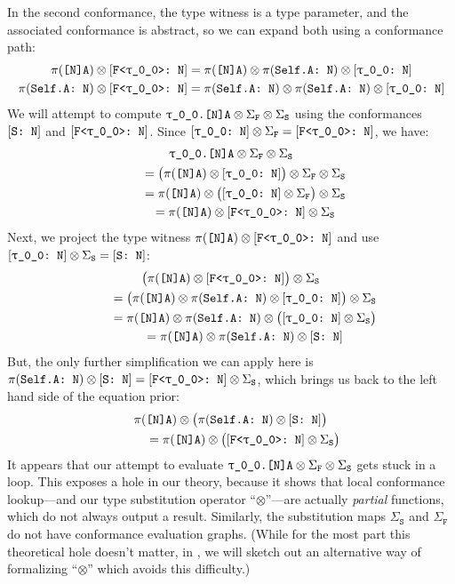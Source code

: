 \documentclass[../generics]{subfiles}
\begin{document}
In the second conformance, the type witness is a type parameter, and the associated conformance is abstract, so we can expand both using a conformance path:
\begin{gather*}
\AssocType{[N]A} \otimes \ConfReq{F<\rT>}{N} = \AssocType{[N]A} \otimes \SelfAToN \otimes \ConfReq{\rT}{N}\\
\SelfAToN \otimes \ConfReq{F<\rT>}{N} = \SelfAToN \otimes \SelfAToN \otimes \ConfReq{\rT}{N}
\end{gather*}
We will attempt to compute $\texttt{\rT.[N]A}\otimes \Sigma_\texttt{F}\otimes\Sigma_\texttt{S}$ using the conformances $[\texttt{S:~N}]$ and $\ConfReq{F<\rT>}{N}$. Since $\ConfReq{\rT}{N} \otimes \Sigma_\texttt{F}=\ConfReq{F<\rT>}{N}$, we have:
\begin{gather*}
\texttt{\rT.[N]A} \otimes \Sigma_\texttt{F}\otimes\Sigma_\texttt{S} \\
\qquad {} = \bigl( \AssocType{[N]A} \otimes \ConfReq{\rT}{N} \bigr) \otimes \Sigma_\texttt{F}\otimes\Sigma_\texttt{S}\\
\qquad {} = \AssocType{[N]A} \otimes \bigl( \ConfReq{\rT}{N} \otimes \Sigma_\texttt{F} \bigr)\otimes\Sigma_\texttt{S}\\
\qquad {} = \AssocType{[N]A} \otimes \ConfReq{F<\rT>}{N} \otimes \Sigma_\texttt{S}
\end{gather*}
Next, we project the type witness $\AssocType{[N]A}\otimes\ConfReq{F<\rT>}{N}$ and use $\ConfReq{\rT}{N} \otimes \Sigma_\texttt{S}=\ConfReq{S}{N}$:
\begin{gather*}
\bigl( \AssocType{[N]A} \otimes \ConfReq{F<\rT>}{N}\bigr)\otimes\Sigma_\texttt{S}\\
\qquad {} = \bigl( \AssocType{[N]A} \otimes \SelfAToN \otimes \ConfReq{\rT}{N} \bigr) \otimes \Sigma_\texttt{S}\\
\qquad {} = \AssocType{[N]A} \otimes \SelfAToN \otimes \bigl( \ConfReq{\rT}{N} \otimes \Sigma_\texttt{S} \bigr)\\
\qquad {} = \AssocType{[N]A} \otimes \SelfAToN \otimes \ConfReq{S}{N}
\end{gather*}
But, the only further simplification we can apply here is $\SelfAToN \otimes \ConfReq{S}{N}=\ConfReq{F<\rT>}{N} \otimes \Sigma_\texttt{S}$, which brings us back to the left hand side of the equation prior:
\begin{gather*}
\AssocType{[N]A} \otimes \bigl( \SelfAToN \otimes \ConfReq{S}{N} \bigr) \\
\qquad {} = \AssocType{[N]A} \otimes \bigl( \ConfReq{F<\rT>}{N} \otimes \Sigma_\texttt{S} \bigr)
\end{gather*}
It appears that our attempt to evaluate $\texttt{\rT.[N]A}\otimes \Sigma_\texttt{F}\otimes\Sigma_\texttt{S}$ gets stuck in a loop. This exposes a hole in our theory, because it shows that local conformance lookup---and our type substitution operator ``$\otimes$''---are actually \emph{partial} functions, which do not always output a result. Similarly, the substitution maps $\Sigma_\texttt{S}$ and $\Sigma_\texttt{F}$ do not have conformance evaluation graphs. (While for the most part this theoretical hole doesn't matter, in , we will sketch out an alternative way of formalizing ``$\otimes$'' which avoids this difficulty.)
\end{document}

